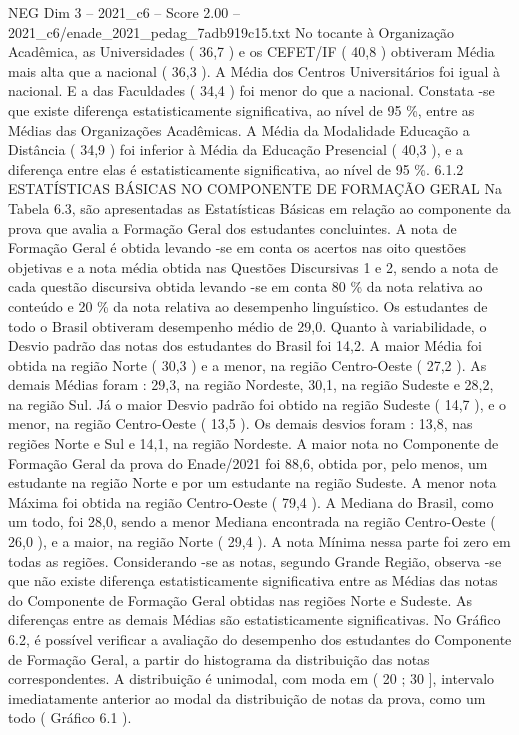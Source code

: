 \begin{textsample}{NEG Dim 3 – 2021\_c6 – Score 2.00 – 2021\_c6/enade\_2021\_pedag\_7adb919c15.txt}
No tocante à Organização Acadêmica, as Universidades ( 36,7 ) e os CEFET/IF ( 40,8 ) obtiveram Média mais alta que a nacional ( 36,3 ).
A Média dos Centros Universitários foi igual à nacional.
E a das Faculdades ( 34,4 ) foi menor do que a nacional.
Constata -se que existe diferença estatisticamente significativa, ao nível de 95 \%, entre as Médias das Organizações Acadêmicas.
A Média da Modalidade Educação a Distância ( 34,9 ) foi inferior à Média da Educação Presencial ( 40,3 ), e a diferença entre elas é estatisticamente significativa, ao nível de 95 \%. 6.1.2 ESTATÍSTICAS BÁSICAS NO COMPONENTE DE FORMAÇÃO GERAL Na Tabela 6.3, são apresentadas as Estatísticas Básicas em relação ao componente da prova que avalia a Formação Geral dos estudantes concluintes.
A nota de Formação Geral é obtida levando -se em conta os acertos nas oito questões objetivas e a nota média obtida nas Questões Discursivas 1 e 2, sendo a nota de cada questão discursiva obtida levando -se em conta 80 \% da nota relativa ao conteúdo e 20 \% da nota relativa ao desempenho linguístico.
Os estudantes de todo o Brasil obtiveram desempenho médio de 29,0.
Quanto à variabilidade, o Desvio padrão das notas dos estudantes do Brasil foi 14,2.
A maior Média foi obtida na região Norte ( 30,3 ) e a menor, na região Centro-Oeste ( 27,2 ).
As demais Médias foram : 29,3, na região Nordeste, 30,1, na região Sudeste e 28,2, na região Sul.
Já o maior Desvio padrão foi obtido na região Sudeste ( 14,7 ), e o menor, na região Centro-Oeste ( 13,5 ).
Os demais desvios foram : 13,8, nas regiões Norte e Sul e 14,1, na região Nordeste.
A maior nota no Componente de Formação Geral da prova do Enade/2021 foi 88,6, obtida por, pelo menos, um estudante na região Norte e por um estudante na região Sudeste.
A menor nota Máxima foi obtida na região Centro-Oeste ( 79,4 ).
A Mediana do Brasil, como um todo, foi 28,0, sendo a menor Mediana encontrada na região Centro-Oeste ( 26,0 ), e a maior, na região Norte ( 29,4 ).
A nota Mínima nessa parte foi zero em todas as regiões.
Considerando -se as notas, segundo Grande Região, observa -se que não existe diferença estatisticamente significativa entre as Médias das notas do Componente de Formação Geral obtidas nas regiões Norte e Sudeste.
As diferenças entre as demais Médias são estatisticamente significativas.
No Gráfico 6.2, é possível verificar a avaliação do desempenho dos estudantes do Componente de Formação Geral, a partir do histograma da distribuição das notas correspondentes.
A distribuição é unimodal, com moda em ( 20 ; 30 ], intervalo imediatamente anterior ao modal da distribuição de notas da prova, como um todo ( Gráfico 6.1 ).

\end{textsample}
